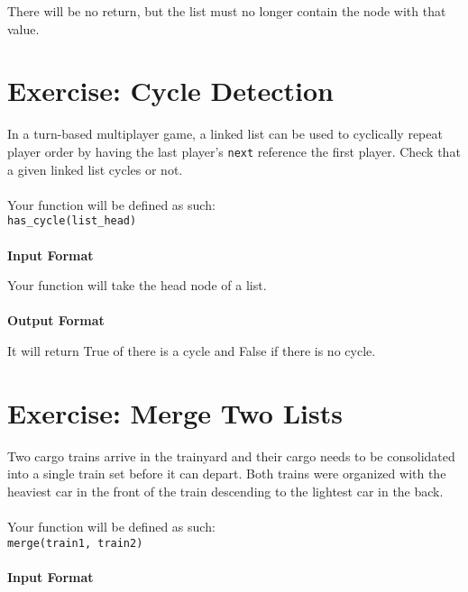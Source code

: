 \documentclass{42-en}
\begin{document}
    There will be no return, but the list must no longer contain the node with that value.

\nextexercice

\chapter{Exercise\exercicenumber: Cycle Detection}

\exnumber{\exercicenumber}

\makeheaderfiles
    In a turn-based multiplayer game, a linked list can be used to cyclically
    repeat player order by having the last player's \texttt{next} reference the
    first player. Check that a given linked list cycles or not.\\
    \\
    Your function will be defined as such:\\
    \texttt{has\_cycle(list\_head)}\\
    \\
    \textbf{Input Format}

    Your function will take the head node of a list.\\
    \\
    \textbf{Output Format}

    It will return True of there is a cycle and False if there is no cycle.

\nextexercice

\chapter{Exercise\exercicenumber: Merge Two Lists}

\exnumber{\exercicenumber}

\makeheaderfiles
    Two cargo trains arrive in the trainyard and their cargo needs to be
    consolidated into a single train set before it can depart. Both trains
    were organized with the heaviest car in the front of the train
    descending to the lightest car in the back.\\
    \\
    Your function will be defined as such:\\
    \texttt{merge(train1, train2)}\\
    \\
    \textbf{Input Format}
\end{document}
